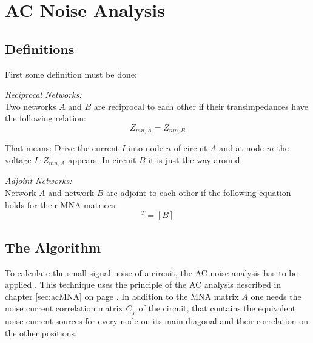 %
%
%
%

\chapter{AC Noise Analysis}

\section{Definitions}

First some definition must be done:

\addvspace{12pt}

\emph{Reciprocal Networks:}\\
Two networks $A$ and $B$ are reciprocal to each other if their
transimpedances have the following relation:
\begin{equation}
Z_{mn,A} = Z_{nm,B}
\end{equation}

That means: Drive the current $I$ into node $n$ of circuit $A$ and
at node $m$ the voltage $I\cdot Z_{mn,A}$ appears. In circuit $B$
it is just the way around.

\addvspace{12pt}

\emph{Adjoint Networks:}\\
Network $A$ and network $B$ are adjoint to each other if the following
equation holds for their MNA matrices:
\begin{equation}
[A]^T = [B]
\end{equation}

\section{The Algorithm}
\label{sec:acnoise_algo}

To calculate the small signal noise of a circuit, the AC noise
analysis has to be applied \cite{Blum}.  This technique uses the
principle of the AC analysis described in chapter \ref{sec:acMNA} on
page \pageref{sec:acMNA}.  In addition to the MNA matrix $A$ one needs
the noise current correlation matrix $\underline{C}_Y$ of the circuit,
that contains the equivalent noise current sources for every node on
its main diagonal and their correlation on the other positions.

